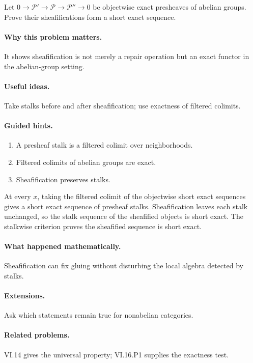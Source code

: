 \begin{problem}\label{prob:vi16-p12}
Let $0\to\mathcal P'\to\mathcal P\to\mathcal P''\to0$ be objectwise exact presheaves of abelian groups.  Prove their sheafifications form a short exact sequence.
\end{problem}

\ifdefined\FullProblemDossiers
\paragraph{Why this problem matters.}
It shows sheafification is not merely a repair operation but an exact functor in the abelian-group setting.

\paragraph{Useful ideas.}
Take stalks before and after sheafification; use exactness of filtered colimits.

\paragraph{Guided hints.}
\begin{enumerate}
\item A presheaf stalk is a filtered colimit over neighborhoods.
\item Filtered colimits of abelian groups are exact.
\item Sheafification preserves stalks.
\end{enumerate}

\begin{solution}
At every $x$, taking the filtered colimit of the objectwise short exact sequences gives a short exact sequence of presheaf stalks.  Sheafification leaves each stalk unchanged, so the stalk sequence of the sheafified objects is short exact.  The stalkwise criterion proves the sheafified sequence is short exact.
\end{solution}

\paragraph{What happened mathematically.}
Sheafification can fix gluing without disturbing the local algebra detected by stalks.

\paragraph{Extensions.}
Ask which statements remain true for nonabelian categories.

\paragraph{Related problems.}
VI.14 gives the universal property; VI.16.P1 supplies the exactness test.
\fi
